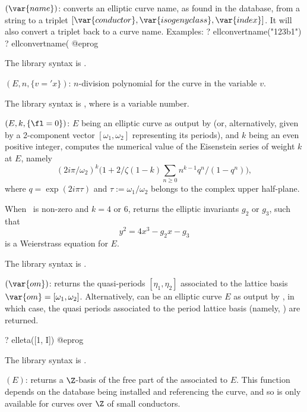 $(\var{name})$: \label{se:ellconvertname}
converts an elliptic curve name, as found in the  database,
from a string to a triplet $[\var{conductor}, \var{isogeny class},
\var{index}]$. It will also convert a triplet back to a curve name.
Examples:
\bprog
? ellconvertname("123b1")
? ellconvertname(%
@eprog

The library syntax is .

$(E,n,\{v='x\})$: \label{se:elldivpol}$n$-division polynomial for the curve  in the
variable $v$.

The library syntax is , where  is a variable number.

$(E,k,\{\fl=0\})$: \label{se:elleisnum}
$E$ being an elliptic curve as
output by  (or, alternatively, given by a 2-component vector
$[\omega_1,\omega_2]$ representing its periods), and $k$ being an even
positive integer, computes the numerical value of the Eisenstein series of
weight $k$ at $E$, namely
$$
(2i \pi/\omega_2)^k
\Big(1 + 2/\zeta(1-k) \sum_{n\geq 0} n^{k-1}q^n / (1-q^n)\Big),
$$
where $q = \exp(2i\pi \tau)$ and $\tau:=\omega_1/\omega_2$ belongs to the
complex upper half-plane.

When \fl\ is non-zero and $k=4$ or 6, returns the elliptic invariants $g_2$
or $g_3$, such that
$$y^2 = 4x^3 - g_2 x - g_3$$
is a Weierstrass equation for $E$.

The library syntax is .

$(\var{om})$: \label{se:elleta}
returns the quasi-periods $[\eta_1,\eta_2]$
associated to the lattice basis $\var{om} = [\omega_1, \omega_2]$.
Alternatively,  can be an elliptic curve $E$ as output by
, in which case, the quasi periods associated to the period
lattice basis  (namely, ) are returned.

\bprog
? elleta([1, I])
@eprog

The library syntax is .

$(E)$: \label{se:ellgenerators}
returns a $\Z$-basis of the free part of the
 associated to $E$.  This function depends on the
 database being installed and referencing the curve, and so
is only available for curves over $\Z$ of small conductors.

